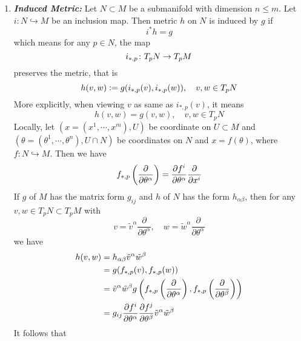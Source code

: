 \begin{enumerate}[label=\arabic{*}.]
	\item {\emph{\textbf{Induced Metric:}}} Let $N \subset M$ be a submanifold with dimension $n \leq m$. Let $i \colon N \hookrightarrow M$ be an inclusion map. Then metric $h$ on $N$ is induced by $g$ if
	\begin{equation*}
		i^*h = g
	\end{equation*}
	which means for any $p \in N$, the map
	\begin{equation*}
		i_{*,p} \colon T_pN \rightarrow T_pM
	\end{equation*}
	preserves the metric, that is
	\begin{equation*}
		h(v,w) \vcentcolon= g(i_{*,p}(v),i_{*,p}(w)),\quad v,w \in T_pN
	\end{equation*}
	More explicitly, when viewing $v$ as same as $i_{*,p}(v)$, it means
	\begin{equation*}
		h(v,w) = g(v,w),\quad v,w \in T_pN
	\end{equation*}
	Locally, let $(x=(x^1,\cdots,x^m),U)$ be coordinate on $U \subset M$ and $(\theta=(\theta^1,\cdots,\theta^n),U\cap N)$ be coordinates on $N$ and $x = f(\theta)$, where $f \colon N \hookrightarrow M$. Then we have
	\begin{equation*}
		f_{*,p}\left(\frac{\partial}{\partial \theta^\alpha}\right) = \frac{\partial f^i}{\partial \theta^\alpha}\frac{\partial}{\partial x^i}
	\end{equation*}
	If $g$ of $M$ has the matrix form $g_{ij}$ and $h$ of $N$ has the form $h_{\alpha \beta}$, then for any $v,w \in T_pN \subset T_pM$ with
	\begin{equation*}
		v = \tilde{v}^\alpha\frac{\partial}{\partial \theta^\alpha},\quad w = \tilde{w}^\alpha\frac{\partial}{\partial \theta^\alpha}
	\end{equation*}
	we have
	\begin{equation*}
		\begin{aligned}
			h(v,w) &= h_{\alpha \beta} \tilde{v}^\alpha \tilde{w}^\beta \\
			&= g(f_{*,p}(v),f_{*,p}(w)) \\
			&= \tilde{v}^\alpha\tilde{w}^\beta g\left(f_{*,p}\left(\frac{\partial}{\partial \theta^\alpha}\right),f_{*,p}\left(\frac{\partial}{\partial \theta^\beta}\right)\right) \\
			&=  g_{ij}\frac{\partial f^i}{\partial \theta^\alpha} \frac{\partial f^j}{\partial \theta^\beta}\tilde{v}^\alpha\tilde{w}^\beta
		\end{aligned}
	\end{equation*}
	It follows that
	\begin{equation*}

\end{equation*}
\end{enumerate}
